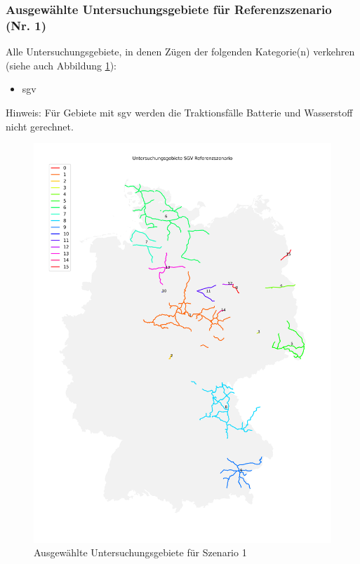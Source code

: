 \subsubsection{Ausgewählte Untersuchungsgebiete für Referenzszenario (Nr. 1)}\label{chap_scenario_1_ausgewählte_untersuchungsgebiete}
Alle Untersuchungsgebiete, in denen Zügen der folgenden Kategorie(n) verkehren (siehe auch Abbildung \ref{fig_s_1_ausgewählte_untersuchungsgebiete}):
\begin{itemize}
    \item \acrlong{sgv}
\end{itemize}

Hinweis: Für Gebiete mit \acrshort{sgv} werden die Traktionsfälle Batterie und Wasserstoff nicht gerechnet.

\begin{center}
	\begin{figure}[p]
	\includegraphics[height=0.85\textheight]{../report_scenarios/s_1/files/master_areas_sgv}
	\caption{\label{fig_s_1_ausgewählte_untersuchungsgebiete} Ausgewählte Untersuchungsgebiete für Szenario 1}
	\end{figure}
\end{center}


